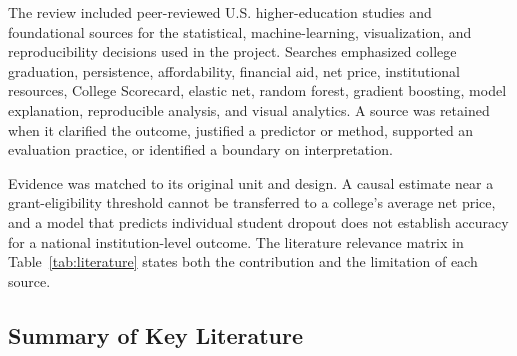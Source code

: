 \documentclass[12pt,a4paper]{article}
\begin{document}
The review included peer-reviewed U.S. higher-education studies and foundational sources for the statistical, machine-learning, visualization, and reproducibility decisions used in the project. Searches emphasized college graduation, persistence, affordability, financial aid, net price, institutional resources, College Scorecard, elastic net, random forest, gradient boosting, model explanation, reproducible analysis, and visual analytics. A source was retained when it clarified the outcome, justified a predictor or method, supported an evaluation practice, or identified a boundary on interpretation.

Evidence was matched to its original unit and design. A causal estimate near a grant-eligibility threshold cannot be transferred to a college's average net price, and a model that predicts individual student dropout does not establish accuracy for a national institution-level outcome. The literature relevance matrix in Table~\ref{tab:literature} states both the contribution and the limitation of each source.

\subsection{Summary of Key Literature}
\end{document}
